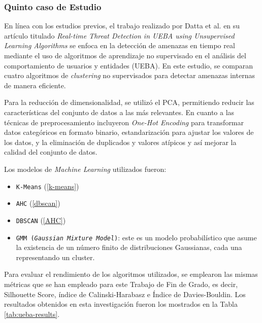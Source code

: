 
\subsubsection*{Quinto caso de Estudio}
En línea con los estudios previos, el trabajo realizado por Datta et al. \cite{9614848} en su artículo titulado \textit{Real-time Threat Detection in \gls{UEBA} using Unsupervised Learning Algorithms} se enfoca en la detección de amenazas en tiempo real mediante el uso de algoritmos de aprendizaje no supervisado en el análisis del comportamiento de usuarios y entidades (\gls{UEBA}). En este estudio, se comparan cuatro algoritmos de \textit{clustering} no supervisados para detectar amenazas internas de manera eficiente.

Para la reducción de dimensionalidad, se utilizó el \gls{PCA}, permitiendo reducir las características del conjunto de datos a las más relevantes. En cuanto a las técnicas de preprocesamiento incluyeron \textit{One-Hot Encoding} para transformar datos categóricos en formato binario, estandarización para ajustar los valores de los datos, y la eliminación de duplicados y valores atípicos y así mejorar la calidad del conjunto de datos.

\newpage

Los modelos de \textit{Machine Learning} utilizados fueron:
\begin{itemize}
    \item \texttt{K-Means} (\ref{k-means})
    \item \texttt{\gls{AHC}} (\ref{dbscan})
    \item \texttt{\gls{DBSCAN}} (\ref{AHC})
    \item \texttt{\gls{GMM} (\textit{Gaussian Mixture Model})}: este es un modelo probabilístico que asume la existencia de un número finito de distribuciones Gaussianas, cada una representando un cluster. \\
\end{itemize}

Para evaluar el rendimiento de los algoritmos utilizados, se emplearon las mismas métricas que se han empleado para este Trabajo de Fin de Grado, es decir, Silhouette Score, índice de Calinski-Harabasz e Índice de Davies-Bouldin. Los resultados obtenidos en esta investigación fueron los mostrados en la Tabla \ref{tab:ueba-results}.

